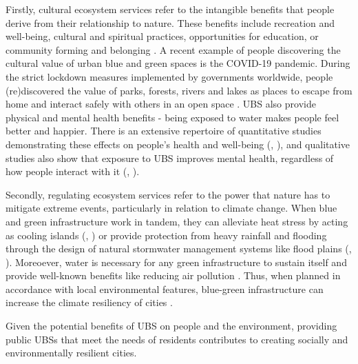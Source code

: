 \documentclass{article}
\begin{document}
Firstly, cultural ecosystem services refer to the intangible benefits that people derive from their relationship to nature. These benefits include recreation and well-being, cultural and spiritual practices, opportunities for education, or community forming and belonging \parencite{phillips2021use}. A recent example of people discovering the cultural value of urban blue and green spaces is the COVID-19 pandemic. During the strict lockdown measures implemented by governments worldwide, people (re)discovered the value of parks, forests, rivers and lakes as places to escape from home and interact safely with others in an open space \parencite{kohsaka2021urban}. 
UBS also provide physical and mental health benefits - being exposed to water makes people feel better and happier. There is an extensive repertoire of quantitative studies demonstrating these effects on people's health and well-being (\cite{gascon2017outdoor}, \cite{britton2020blue}), and qualitative studies also show that exposure to UBS improves mental health, regardless of how people interact with it (\cite{garrett2019urban}, \cite{van2021urban}).

Secondly, regulating ecosystem services refer to the power that nature has to mitigate extreme events, particularly in relation to climate change. When blue and green infrastructure work in tandem, they can alleviate heat stress by acting as cooling islands (\cite{gunawardena2017utilising}, \cite{lin2020water}) or provide protection from heavy rainfall and flooding through the design of natural stormwater management systems like flood plains (\cite{o2020sustainable}, \cite{ghofrani2017comprehensive}). Moreoever, water is necessary for  any green infrastructure to sustain itself and provide well-known benefits like reducing air pollution \parencite{pugh2012effectiveness}. Thus, when planned in accordance with local environmental features, blue-green infrastructure can increase the climate resiliency of cities \parencite{o2021international}.



Given the potential benefits of UBS on people and the environment, providing public UBSs that meet the needs of residents contributes to creating socially and environmentally resilient cities.
 
\end{document}
